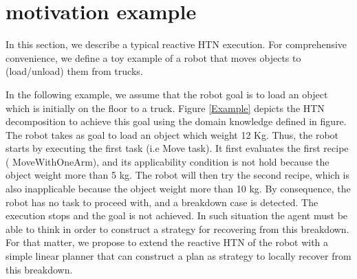 \documentclass[conference]{IEEEtran}
\begin{document}
	
	\section{motivation example }
	\par In this section, we describe a typical reactive HTN execution. For comprehensive convenience, we define a toy example of a robot that moves objects to (load/unload) them from trucks.
	
	In the following example, we assume that the robot goal is to load an object which is initially on the floor to a truck. Figure \ref{Example} depicts the HTN decomposition to achieve this goal using the domain knowledge defined in figure. The robot takes as goal to load an object which weight 12 Kg. Thus, the robot starts by executing the first task (i.e Move task). It first evaluates the first recipe ( MoveWithOneArm), and its applicability condition is not hold because the object weight more than 5 kg. The robot will then try the second recipe, which is also inapplicable because the object weight more than 10 kg. By consequence, the robot has no task to proceed with, and a breakdown case is detected. The execution stops and the goal is not achieved. In such situation the agent must be able to think in order to construct a strategy for recovering from this breakdown. For that matter, we propose to extend the reactive HTN of the robot with a simple linear planner that can construct a plan as strategy to locally recover from this breakdown. 
	
\end{document}
